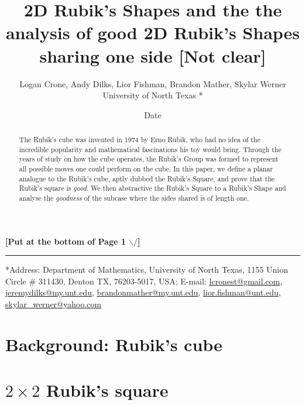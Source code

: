 \documentclass{article}
\title{2D Rubik's Shapes and the the analysis of good 2D Rubik's Shapes sharing one side \textbf{[Not clear]}}
\author{Logan Crone, Andy Dilks, Lior Fishman, Brandon Mather, Skylar Werner\\
University of North Texas *}
\date{Date}
\begin{document}
\maketitle
\begin{abstract}
    The Rubik's cube was invented in 1974 by Erno Rubik, who had no idea of the incredible popularity and mathematical fascinations his toy would bring. Through the years of study on how the cube operates, the Rubik's Group was formed to represent all possible moves one could perform on the cube. In this paper, we define a planar analogue to the Rubik's cube, aptly dubbed the Rubik's Square, and prove that the Rubik's square is \textit{good}. We then abstractive the Rubik's Square to a Rubik's Shape and analyse the \textit{goodness} of the subcase where the sides shared is of length one.
\end{abstract}

\textbf{[Put at the bottom of Page 1 $\backslash/$]}

\noindent\rule{6cm}{0.4pt}

*Address:\;\; Department of Mathematics, University of North Texas, 1155 Union Circle \# 311430, Denton TX, 76203-5017, USA; E-mail:\;\; \href{mailto:lcronest@gmail.com}{lcronest@gmail.com}, \href{mailto:jeremydilks@my.unt.edu}{jeremydilks@my.unt.edu}, \href{mailto:brandonmather@my.unt.edu}{brandonmather@my.unt.edu}, \href{mailto:lior.fishman@unt.edu}{lior.fishman@unt.edu}, \href{mailto:skylar\_werner@yahoo.com}{skylar\_werner@yahoo.com}

\section{Background: Rubik's cube}

\section{$2\times 2$ Rubik's square}

\end{document}
